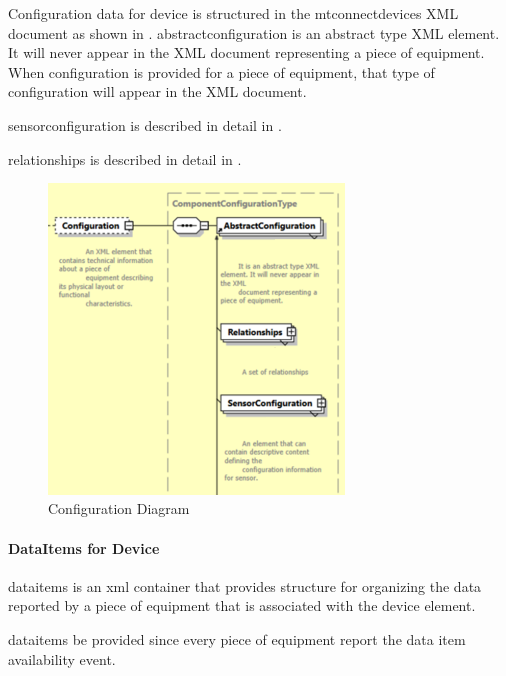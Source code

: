 

Configuration data for \gls{device} is structured in the \gls{mtconnectdevices} XML document as shown in .   \gls{abstractconfiguration} is an abstract type XML element.   It will never appear in the XML document representing a piece of equipment.    When \gls{configuration} is provided for a piece of equipment, that type of \gls{configuration} will appear in the XML document.

\gls{sensorconfiguration} is described in detail in .

\gls{relationships} is described in detail in .

\begin{figure}[ht]
  \centering
  \includegraphics[width=0.7\textwidth]{figures/configuration-schema-diagram.png}
  \caption{Configuration Diagram}
  \label{fig:configuration-diagram}
\end{figure}
\FloatBarrier

\paragraph{DataItems for Device}\mbox{}

\gls{dataitems} is an \gls{xml} container that provides structure for organizing the data reported by a piece of equipment that is associated with the \gls{device} element.   

\gls{dataitems} \MUST be provided since every piece of equipment \MUST report the data item \gls{availability event}.

